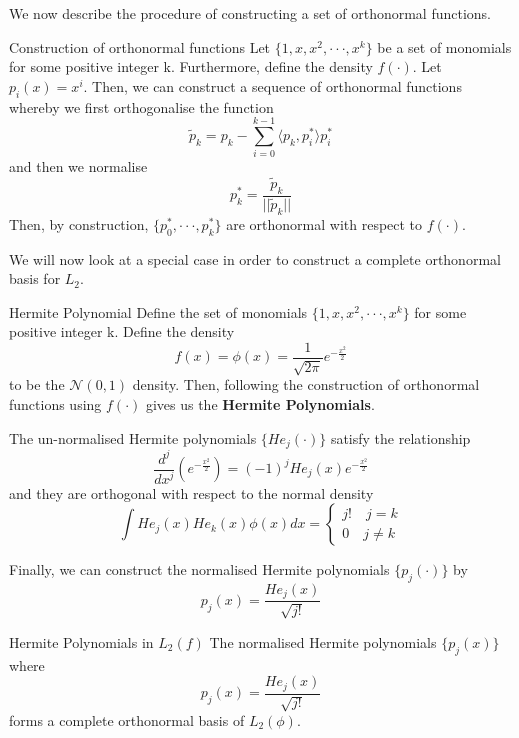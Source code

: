 \documentclass[twoside]{article}
\begin{document}
We now describe the procedure of constructing a set of orthonormal functions. 

\begin{proposition_exam}{Construction of orthonormal functions}{} Let $\{1, x, x^2, \cdot \cdot \cdot, x^k\}$ be a set of monomials for some positive integer k. Furthermore, define the density $f(\cdot).$ Let $p_i(x) = x^i.$ Then, we can construct a sequence of orthonormal functions whereby we first orthogonalise the function
\begin{equation}
  \tilde{p}_{k} = p_k - \sum_{i=0}^{k-1}\langle p_k, p_{i}^{*}\rangle p_{i}^{*}
\end{equation}
and then we normalise 
\begin{equation}
  p_{k}^{*} = \frac{\tilde{p}_{k}}{||\tilde{p}_{k}||}
\end{equation}
Then, by construction, $\{p_{0}^{*}, \cdot \cdot \cdot, p_{k}^{*}\}$ are orthonormal with respect to $f(\cdot).$
\end{proposition_exam}

We will now look at a special case in order to construct a complete orthonormal basis for $L_2.$

\begin{definition_exam}{Hermite Polynomial}{} Define the set of monomials $\{1, x, x^2, \cdot \cdot \cdot, x^k\}$ for some positive integer k. Define the density 
$$
f(x) = \phi(x) = \frac{1}{\sqrt{2\pi}}e^{-\frac{x^2}{2}}
$$
to be the $\mathcal{N}(0,1)$ density. Then, following the construction of orthonormal functions using $f(\cdot)$ gives us the \textbf{Hermite Polynomials}.
\end{definition_exam}


The un-normalised Hermite polynomials $\{He_j(\cdot)\}$ satisfy the relationship
$$
\frac{d^j}{dx^j}(e^{-\frac{x^2}{2}}) = (-1)^jHe_j(x)e^{-\frac{x^2}{2}}
$$
and they are orthogonal with respect to the normal density
$$
\int He_j(x)He_k(x)\phi(x)dx = 
\begin{cases}
j! \quad j = k\\
0 \quad j \neq k
\end{cases}
$$

Finally, we can construct the normalised Hermite polynomials $\{p_j(\cdot)\}$ by 
$$
p_j(x) = \frac{He_j(x)}{\sqrt{j!}}
$$


\begin{proposition_exam}{Hermite Polynomials in $L_2(f)$}{} The normalised Hermite polynomials $\{p_j(x)\}$ where 
  $$
    p_j(x) = \frac{He_j(x)}{\sqrt{j!}}
  $$
 forms a complete orthonormal basis of $L_2(\phi).$
\end{proposition_exam}
\end{document}
